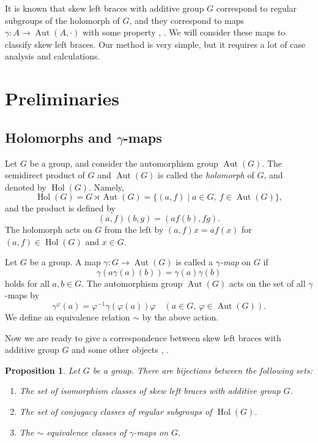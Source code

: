 \documentclass[12pt]{amsart}
\newtheorem{prop}[thm]{Proposition}
\theoremstyle{definition}
\newcommand{\Aut}{\operatorname{Aut}}
\newcommand{\Hol}{\operatorname{Hol}}
\begin{document}
It is known that skew left braces with additive group $G$ correspond to
regular subgroups of the holomorph of $G$, and they correspond to
maps $\gamma:A\to \Aut(A,\cdot)$ with some property
\cite[Theorem 2.2]{MR4089566}, \cite[Theorem 4.2]{MR3647970}.
We will consider these maps to classify skew left braces.
Our method is very simple,
but it requires a lot of case analysis and calculations.

\section{Preliminaries}
\subsection{Holomorphs and $\gamma$-maps}
Let $G$ be a group, and consider the automorphism group $\Aut(G)$.
The semidirect product of $G$ and $\Aut(G)$ is called
the \emph{holomorph} of $G$, and denoted by $\Hol(G)$.
Namely,
$$\Hol(G)=G\rtimes \Aut(G)=\{(a,f)\mid a\in G,\ f\in \Aut(G)\},$$
and the product is defined by
$$(a,f)(b,g)=(af(b), fg).$$
The holomorph acts on $G$ from the left by
$(a,f)x=af(x)$ for $(a,f)\in \Hol(G)$ and $x\in G$.

Let $G$ be a group.
A map $\gamma:G\to\Aut(G)$ is called a \emph{$\gamma$-map} on $G$ if
$$\gamma(a\gamma(a)(b))=\gamma(a)\gamma(b)$$
holds for all $a, b\in G$.
The automorphism group $\Aut(G)$ acts on the set of all $\gamma$-maps by
$$\gamma^\varphi(a)=\varphi^{-1}\gamma(\varphi(a))\varphi\quad
(a\in G,\ \varphi\in\Aut(G)).$$
We define an equivalence relation $\sim$ by the above action.

Now we are ready to give a correspondence between skew left braces
with additive group $G$ and some other objects
\cite[Theorem 2.2]{MR4089566}, \cite[Theorem 4.2]{MR3647970}.

\begin{prop}\label{prop2.1}
  Let $G$ be a group.
  There are bijections between the following sets:
  \begin{enumerate}[{\rm (1)}]
    \item The set of isomorphism classes of skew left braces
    with additive group $G$.
    \item The set of conjugacy classes of regular subgroups of $\Hol(G)$.
    \item The $\sim$ equivalence classes of $\gamma$-maps on $G$. 
  \end{enumerate}
\end{prop}
\end{document}
